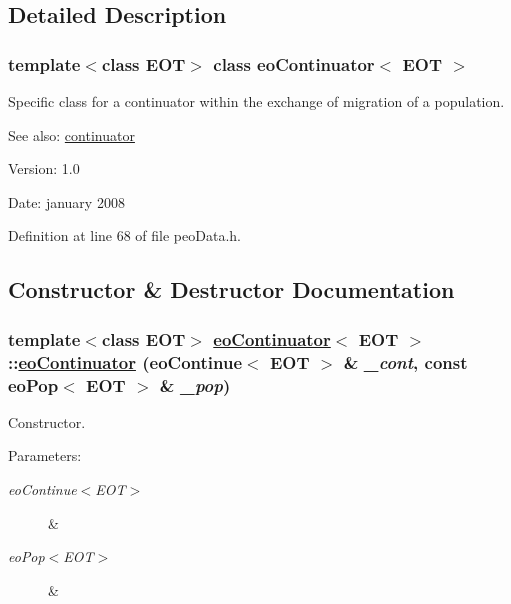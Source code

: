 \subsection{Detailed Description}
\subsubsection*{template$<$class EOT$>$ class eo\-Continuator$<$ EOT $>$}

Specific class for a continuator within the exchange of migration of a population. 

\begin{Desc}
\item[See also:]\hyperlink{classcontinuator}{continuator} \end{Desc}
\begin{Desc}
\item[Version:]1.0 \end{Desc}
\begin{Desc}
\item[Date:]january 2008 \end{Desc}




Definition at line 68 of file peo\-Data.h.

\subsection{Constructor \& Destructor Documentation}
\hypertarget{classeoContinuator_771e03f6ba647b2777dca2b8792fd317}{
\subsubsection[eoContinuator]{\setlength{\rightskip}{0pt plus 5cm}template$<$class EOT$>$ \hyperlink{classeoContinuator}{eo\-Continuator}$<$ EOT $>$::\hyperlink{classeoContinuator}{eo\-Continuator} (\bf{eo\-Continue}$<$ EOT $>$ \& {\em \_\-cont}, const \bf{eo\-Pop}$<$ EOT $>$ \& {\em \_\-pop})}}
\label{classeoContinuator_771e03f6ba647b2777dca2b8792fd317}


Constructor. 

\begin{Desc}
\item[Parameters:]
\begin{description}
\item[{\em eo\-Continue$<$EOT$>$}]\& \item[{\em eo\-Pop$<$EOT$>$}]\& \end{description}
\end{Desc}


